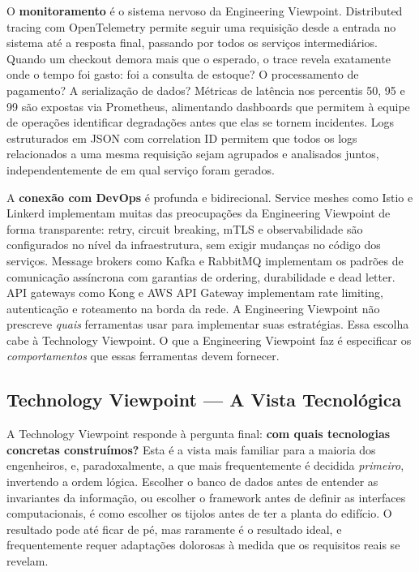 O \textbf{monitoramento} é o sistema nervoso da Engineering Viewpoint. Distributed
tracing com OpenTelemetry permite seguir uma requisição desde a entrada no sistema
até a resposta final, passando por todos os serviços intermediários. Quando um
checkout demora mais que o esperado, o trace revela exatamente onde o tempo foi
gasto: foi a consulta de estoque? O processamento de pagamento? A serialização de
dados? Métricas de latência nos percentis 50, 95 e 99 são expostas via Prometheus,
alimentando dashboards que permitem à equipe de operações identificar degradações
antes que elas se tornem incidentes. Logs estruturados em JSON com correlation ID
permitem que todos os logs relacionados a uma mesma requisição sejam agrupados e
analisados juntos, independentemente de em qual serviço foram gerados.

A \textbf{conexão com DevOps} é profunda e bidirecional. Service meshes como Istio
e Linkerd implementam muitas das preocupações da Engineering Viewpoint de forma
transparente: retry, circuit breaking, mTLS e observabilidade são configurados no
nível da infraestrutura, sem exigir mudanças no código dos serviços. Message
brokers como Kafka e RabbitMQ implementam os padrões de comunicação assíncrona
com garantias de ordering, durabilidade e dead letter. API gateways como Kong e
AWS API Gateway implementam rate limiting, autenticação e roteamento na borda da
rede. A Engineering Viewpoint não prescreve \emph{quais} ferramentas usar para
implementar suas estratégias. Essa escolha cabe à Technology Viewpoint. O que a
Engineering Viewpoint faz é especificar os \emph{comportamentos} que essas
ferramentas devem fornecer.

\subsection{Technology Viewpoint --- A Vista Tecnológica}

A Technology Viewpoint responde à pergunta final: \textbf{com quais tecnologias
concretas construímos?} Esta é a vista mais familiar para a maioria dos
engenheiros, e, paradoxalmente, a que mais frequentemente é decidida
\emph{primeiro}, invertendo a ordem lógica. Escolher o banco de dados antes de
entender as invariantes da informação, ou escolher o framework antes de definir
as interfaces computacionais, é como escolher os tijolos antes de ter a planta
do edifício. O resultado pode até ficar de pé, mas raramente é o resultado ideal,
e frequentemente requer adaptações dolorosas à medida que os requisitos reais
se revelam.

